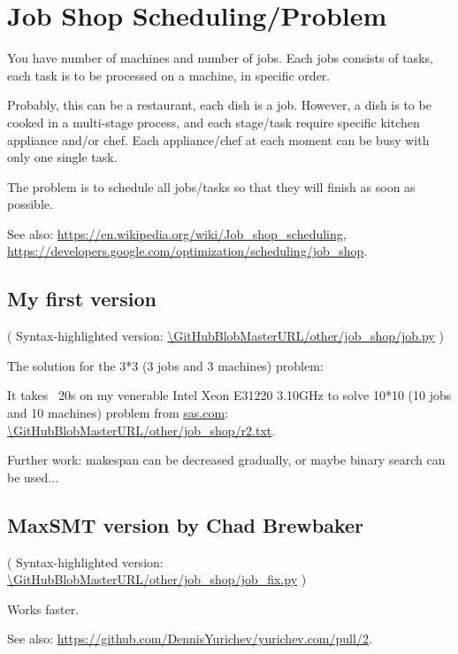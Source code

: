 \section{Job Shop Scheduling/Problem}
\label{JobShop}

\renewcommand{\CURPATH}{other/job_shop}

You have number of machines and number of jobs.
Each jobs consists of tasks, each task is to be processed on a machine, in specific order.

Probably, this can be a restaurant, each dish is a job.
However, a dish is to be cooked in a multi-stage process, and each stage/task require specific kitchen appliance and/or chef.
Each appliance/chef at each moment can be busy with only one single task.

The problem is to schedule all jobs/tasks so that they will finish as soon as possible.

See also:
\url{https://en.wikipedia.org/wiki/Job_shop_scheduling},
\url{https://developers.google.com/optimization/scheduling/job_shop}.

\subsection{My first version}



( Syntax-highlighted version: \url{\GitHubBlobMasterURL/\CURPATH/job.py} )

The solution for the 3*3 (3 jobs and 3 machines) problem:



It takes ~20s on my venerable Intel Xeon E31220 3.10GHz to solve 10*10 (10 jobs and 10 machines) problem from 
\href{http://support.sas.com/documentation/cdl/en/orcpug/63973/HTML/default/viewer.htm#orcpug_clp_sect048.htm}{sas.com}:
\url{\GitHubBlobMasterURL/\CURPATH/r2.txt}.

Further work: makespan can be decreased gradually, or maybe binary search can be used...

\subsection{MaxSMT version by Chad Brewbaker}



( Syntax-highlighted version: \url{\GitHubBlobMasterURL/\CURPATH/job_fix.py} )

Works faster.

See also: \url{https://github.com/DennisYurichev/yurichev.com/pull/2}.

